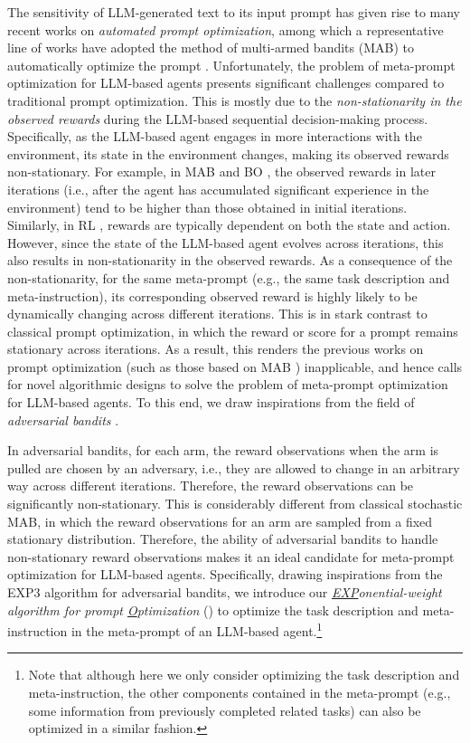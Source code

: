 The sensitivity of LLM-generated text to its input prompt has given rise to many recent works on \emph{automated prompt optimization}, among which a representative line of works have adopted the method of multi-armed bandits (MAB) to automatically optimize the prompt \cite{lin2023instinct,wu2024prompt,lin2024prompt}.
Unfortunately, the problem of meta-prompt optimization for LLM-based agents presents significant challenges compared to traditional prompt optimization. 
This is mostly due to the \emph{non-stationarity in the observed rewards} during the LLM-based sequential decision-making process. 
Specifically, as the LLM-based agent engages in more interactions with the environment, its state in the environment changes, making its observed rewards non-stationary. 
For example, in MAB \cite{krishnamurthy2024can} and BO \cite{yang2023large}, the observed rewards in later iterations (i.e., after the agent has accumulated significant experience in the environment) tend to be higher than those obtained in initial iterations. 
Similarly, in RL \cite{dai2024context}, rewards are typically dependent on both the state and action. However, since the state of the LLM-based agent evolves across iterations, this also results in non-stationarity in the observed rewards.
As a consequence of the non-stationarity, for the same meta-prompt (e.g., the same task description and meta-instruction), its corresponding observed reward is highly likely to be dynamically changing across different iterations. This is in stark contrast to classical prompt optimization, in which the reward or score for a prompt remains stationary across iterations. 
As a result, this renders the previous works on prompt optimization (such as those based on MAB \cite{lin2023instinct,wu2024prompt,lin2024prompt}) inapplicable, and hence calls for novel algorithmic designs to solve the problem of meta-prompt optimization for LLM-based agents. To this end, we draw inspirations from the field of \emph{adversarial bandits} \cite{lattimore2020bandit}.

In adversarial bandits, for each arm, the reward observations when the arm is pulled are chosen by an adversary, i.e., they are allowed to change in an arbitrary way across different iterations. Therefore, the reward observations can be significantly non-stationary. 
This is considerably different from classical stochastic MAB, in which the reward observations for an arm are sampled from a fixed stationary distribution. Therefore, the ability of adversarial bandits to handle non-stationary reward observations makes it an ideal candidate for meta-prompt optimization for LLM-based agents. 
Specifically, drawing inspirations from the EXP3 algorithm for adversarial bandits, we introduce our \emph{\underline{EXP}onential-weight algorithm for prompt \underline{O}ptimization} (\alg) to optimize the task description and meta-instruction in the meta-prompt of an LLM-based agent.\footnote{Note that although here we only consider optimizing the task description and meta-instruction, the other components contained in the meta-prompt (e.g., some information from previously completed related tasks) can also be optimized in a similar fashion.}


